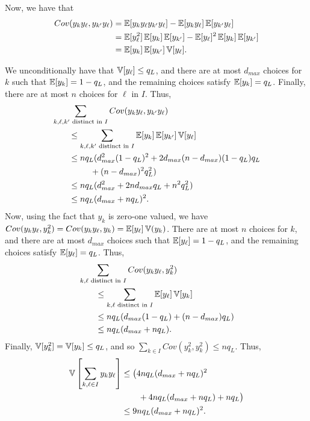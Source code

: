 Now, we have that
\begin{align*}
    Cov(y_k y_\ell, y_{k'}y_\ell) &= \operatorname{\mathbb{E}}[y_ky_{\ell}y_{k'}y_\ell ] - \operatorname{\mathbb{E}}[y_ky_\ell]\operatorname{\mathbb{E}}[y_{k'}y_\ell] \\
    &= \operatorname{\mathbb{E}}[ y_\ell^2]\operatorname{\mathbb{E}}[y_{k}]\operatorname{\mathbb{E}}[y_{k'}] - \operatorname{\mathbb{E}}[y_\ell]^2\operatorname{\mathbb{E}}[y_{k}]\operatorname{\mathbb{E}}[y_{k'}] \\
    &= \operatorname{\mathbb{E}}[y_k]\operatorname{\mathbb{E}}[y_{k'}] \operatorname{\mathbb{V}}[y_\ell].
\end{align*}

We unconditionally have that $\operatorname{\mathbb{V}}[y_\ell] \leq q_L$, and there are
at most $d_{max}$ choices for $k$
such that $\operatorname{\mathbb{E}}[y_k] = 1-q_L$, and the remaining choices satisfy $\operatorname{\mathbb{E}}[y_k] = q_L$. Finally, there are at most $n$ choices for $\ell$ in $I$. Thus,
\begin{align*}
    &\sum_{k,\ell,k' \text{ distinct in } I} Cov(y_k y_\ell, y_{k'}y_{\ell}) \\
    &\qquad \leq \sum_{k,\ell,k' \text{ distinct in } I} \E[y_k]\E[y_{k'}] \V[y_\ell] \\
    &\qquad \leq nq_L ( d_{max}^2 (1-q_L)^2 + 2d_{max}(n-d_{max}) (1-q_L) q_L \\
    &\hspace{16mm} + (n-d_{max})^2 q_L^2) \\
    &\qquad \leq nq_L ( d_{max}^2 + 2nd_{max} q_L + n^2q_L^2) \\
    &\qquad \leq nq_L (d_{max} + nq_L)^2.
\end{align*}
Now,
using the fact that $y_k$ is zero-one valued,
we have $Cov(y_k y_\ell, \allowbreak y_k^2) =
Cov(y_k y_\ell, y_k)= \operatorname{\mathbb{E}}[y_\ell] \operatorname{\mathbb{V}}(y_k)$. There are at most $n$ choices for $k$, and there are
at most $d_{max}$ choices such that $\operatorname{\mathbb{E}}[y_\ell] = 1-q_L$, and
the remaining choices satisfy
$\operatorname{\mathbb{E}}[y_\ell] = q_L$. Thus,
\begin{align*}
    &\sum_{k,\ell \text{ distinct in } I} Cov(y_k y_\ell, y_k^2) \\
    &\qquad \leq \sum_{k,\ell \text{ distinct in } I} \operatorname{\mathbb{E}}[y_\ell]\operatorname{\mathbb{V}}[y_k] \\
    &\qquad \leq nq_L (d_{max}(1-q_L) + (n-d_{max})q_L) \\
    &\qquad \leq nq_L (d_{max} + nq_L).
\end{align*}
Finally, $\operatorname{\mathbb{V}}[y_k^2] = \operatorname{\mathbb{V}}[y_k] \leq q_L$, and so $\sum_{k \in I} Cov(y_k^2, y_k^2) \leq nq_L$. Thus,
\begin{align*}
  \operatorname{\mathbb{V}}\left[\sum_{k,\ell \in I} y_ky_\ell \right] &\leq \big(4nq_L(d_{max} +
    nq_L)^2 \\ &\qquad+ 4nq_L(d_{max} + nq_L) + nq_L\big) \\
    &\leq 9nq_L(d_{max} + nq_L)^2.
\end{align*}

